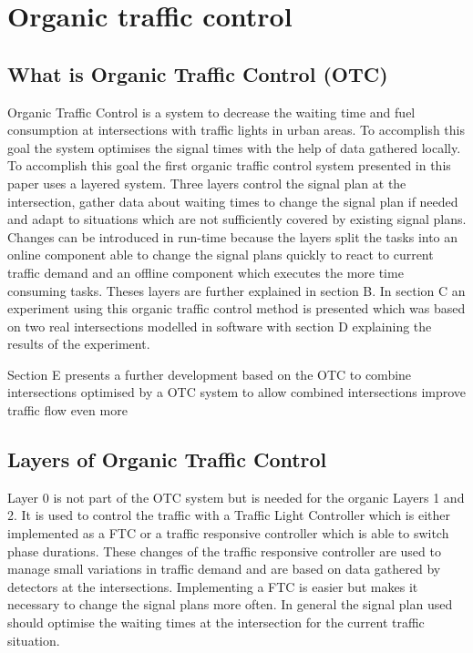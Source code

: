 \section{Organic traffic control}

\subsection{What is Organic Traffic Control (OTC)}
Organic Traffic Control is a system to decrease the waiting time and fuel consumption at
intersections with traffic lights in urban areas. To accomplish this goal the system optimises the
signal times with the help of data gathered locally.
To accomplish this goal the first organic traffic control system presented in this paper uses a layered system. Three layers control the signal plan at the intersection, gather data about waiting times to change the signal plan if needed and adapt to situations which are not sufficiently covered by existing signal plans. Changes can be introduced in run-time because the layers split the tasks into an online component able to change the signal plans quickly to react to current traffic demand and an offline component which executes the more time consuming tasks.  Theses layers are further explained in section B.
In section C an experiment using this organic traffic control method is presented which was based on two real intersections modelled in software with section D explaining the results of the experiment.

Section E presents a further development based on the OTC to combine intersections optimised by a OTC system to allow combined intersections improve traffic flow even more

\subsection{Layers of Organic Traffic Control}
Layer 0
 is not part of the OTC system but is needed for the organic Layers 1 and 2. It is used to control the traffic with a Traffic Light Controller which is either implemented as a FTC or a traffic responsive controller which is able to switch phase durations. These changes of the traffic responsive controller are used to manage small variations in traffic demand and are based on data gathered by detectors at the intersections. Implementing a FTC is easier but makes it necessary to change the signal plans more often. In general the signal plan used should optimise the waiting times at the intersection for the current traffic situation.
 
